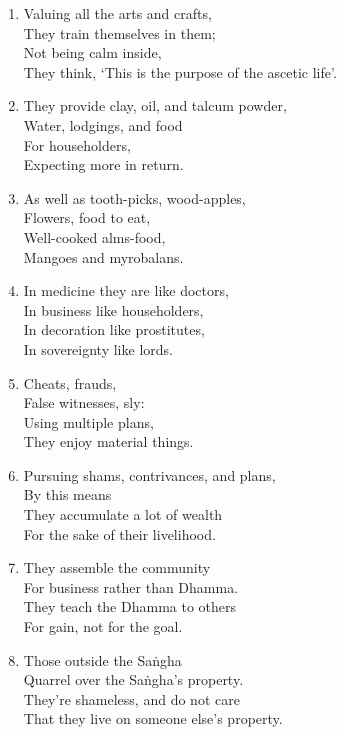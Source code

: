 \documentclass[10pt, openany]{book}
\begin{document}
\begin{enumerate}
\item Valuing all the arts and crafts,\\
They train themselves in them;\\
Not being calm inside,\\
They think, ‘This is the purpose of the ascetic life’.

\item They provide clay, oil, and talcum powder,\\
Water, lodgings, and food\\
For householders,\\
Expecting more in return.

\item As well as tooth-picks, wood-apples,\\
Flowers, food to eat,\\
Well-cooked alms-food,\\
Mangoes and myrobalans.

\item In medicine they are like doctors,\\
In business like householders,\\
In decoration like prostitutes,\\
In sovereignty like lords.

\item Cheats, frauds,\\
False witnesses, sly:\\
Using multiple plans,\\
They enjoy material things.

\item Pursuing shams, contrivances, and plans,\\
By this means\\
They accumulate a lot of wealth\\
For the sake of their livelihood.

\item They assemble the community\\
For business rather than Dhamma.\\
They teach the Dhamma to others\\
For gain, not for the goal.

\item Those outside the Saṅgha\\
Quarrel over the Saṅgha’s property.\\
They’re shameless, and do not care\\
That they live on someone else’s property.


\end{enumerate}
\end{document}
